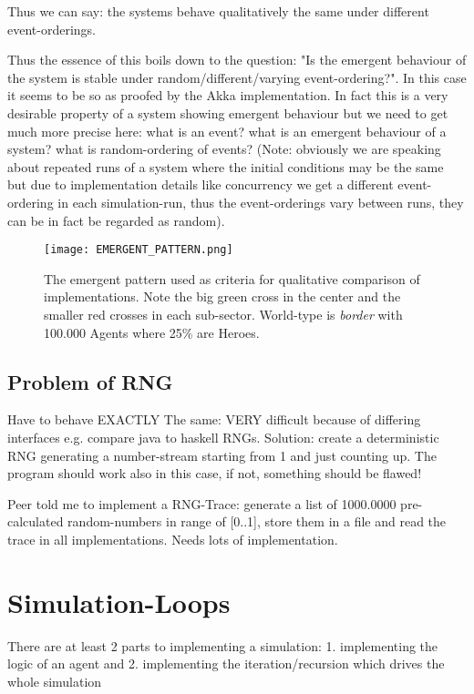 Thus we can say: the systems behave qualitatively the same under different event-orderings.

Thus the essence of this boils down to the question: "Is the emergent behaviour of the system is stable under random/different/varying event-ordering?". In this case it seems to be so as proofed by the Akka implementation. In fact this is a very desirable property of a system showing emergent behaviour but we need to get much more precise here: what is an event? what is an emergent behaviour of a system? what is random-ordering of events? (Note: obviously we are speaking about repeated runs of a system where the initial conditions may be the same but due to implementation details like concurrency we get a different event-ordering in each simulation-run, thus the event-orderings vary between runs, they can be in fact be regarded as random).

\begin{figure}[H]
	\centering
  \texttt{[image: EMERGENT\_PATTERN.png]}
  	\caption{The emergent pattern used as criteria for qualitative comparison of implementations. Note the big green cross in the center and the smaller red crosses in each sub-sector. World-type is \textit{border} with 100.000 Agents where 25\% are Heroes.}
	\label{fig:EMERGENT_PATTERN}
\end{figure}


\subsection{Problem of RNG}
Have to behave EXACTLY The same: VERY difficult because of differing interfaces e.g. compare java to haskell RNGs.
Solution: create a deterministic RNG generating a number-stream starting from 1 and just counting up. The program should work also in this case, if not, something should be flawed!

Peer told me to implement a RNG-Trace: generate a list of 1000.0000 pre-calculated random-numbers in range of [0..1], store them in a file and read the trace in all implementations. Needs lots of implementation.

\section{Simulation-Loops}
There are at least 2 parts to implementing a simulation: 1. implementing the logic of an agent and 2. implementing the iteration/recursion which drives the whole simulation

